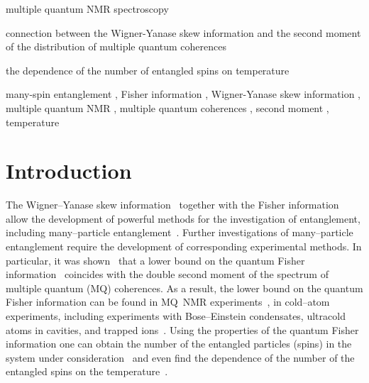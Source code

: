 \documentclass[preprint,12pt]{elsarticle}
\begin{document}
\begin{frontmatter}

\begin{highlights}
	\item multiple quantum NMR spectroscopy
	\item connection between the Wigner-Yanase skew information and the second moment of the distribution of multiple quantum coherences
	\item the dependence of the number of entangled spins on temperature
\end{highlights}

\begin{keyword}
	many-spin entanglement \sep
	Fisher information \sep
	Wigner-Yanase skew information \sep
	multiple quantum NMR \sep
	multiple quantum coherences \sep
	second moment \sep
	temperature
\end{keyword}

\end{frontmatter}

\linenumbers


\section{Introduction}
\label{sec:1}
The Wigner--Yanase skew information~\cite{1,2,3,4} together with the Fisher information~\cite{5,6} allow the development of powerful methods for the investigation of entanglement, including many--particle entanglement~\cite{7,8}.
Further investigations of many--particle entanglement require the development of corresponding experimental methods.
In particular, it was shown~\cite{7,9} that a lower bound on the quantum Fisher information~\cite{5,6} coincides with the double second moment of the spectrum of multiple quantum (MQ) coherences.
As a result, the lower bound on the quantum Fisher information can be found in MQ~NMR experiments~\cite{10},
in cold--atom experiments, including experiments with Bose--Einstein condensates, ultracold atoms in cavities, and trapped ions~\cite{11,12,13,14,15}.
Using the properties of the quantum Fisher information one can obtain the number of the entangled particles (spins) in the system under consideration~\cite{7}
and even find the dependence of the number of the entangled spins on the temperature~\cite{9}.
\end{document}
